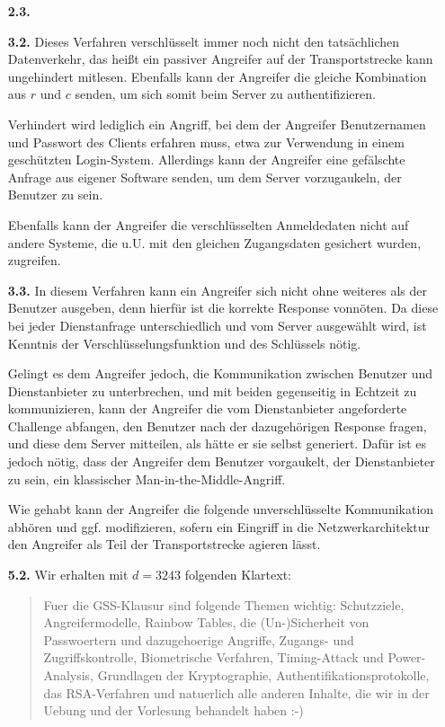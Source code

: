 \documentclass[a4paper,11pt]{article}
\begin{document}
\begin{enumerate}
\item[\textbf{2.3.}]

\item[\textbf{3.2.}]
    Dieses Verfahren verschlüsselt immer noch nicht den tatsächlichen Datenverkehr, das heißt ein passiver Angreifer auf der Transportstrecke kann ungehindert mitlesen. Ebenfalls kann der Angreifer die gleiche Kombination aus $r$ und $c$ senden, um sich somit beim Server zu authentifizieren.

    Verhindert wird lediglich ein Angriff, bei dem der Angreifer Benutzernamen und Passwort des Clients erfahren muss, etwa zur Verwendung in einem geschützten Login-System. Allerdings kann der Angreifer eine gefälschte Anfrage aus eigener Software senden, um dem Server vorzugaukeln, der Benutzer zu sein.

    Ebenfalls kann der Angreifer die verschlüsselten Anmeldedaten nicht auf andere Systeme, die u.U. mit den gleichen Zugangsdaten gesichert wurden, zugreifen.

\item[\textbf{3.3.}]
    In diesem Verfahren kann ein Angreifer sich nicht ohne weiteres als der Benutzer ausgeben, denn hierfür ist die korrekte Response vonnöten. Da diese bei jeder Dienstanfrage unterschiedlich und vom Server ausgewählt wird, ist Kenntnis der Verschlüsselungsfunktion und des Schlüssels nötig.

    Gelingt es dem Angreifer jedoch, die Kommunikation zwischen Benutzer und Dienstanbieter zu unterbrechen, und mit beiden gegenseitig in Echtzeit zu kommunizieren, kann der Angreifer die vom Dienstanbieter angeforderte Challenge abfangen, den Benutzer nach der dazugehörigen Response fragen, und diese dem Server mitteilen, als hätte er sie selbst generiert. Dafür ist es jedoch nötig, dass der Angreifer dem Benutzer vorgaukelt, der Dienstanbieter zu sein, ein klassischer Man-in-the-Middle-Angriff.

    Wie gehabt kann der Angreifer die folgende unverschlüsselte Kommunikation abhören und ggf. modifizieren, sofern ein Eingriff in die Netzwerkarchitektur den Angreifer als Teil der Transportstrecke agieren lässt.

\item[\textbf{5.2.}]
    Wir erhalten mit $d=3243$ folgenden Klartext:
    \begin{quote}
        Fuer die GSS-Klausur sind folgende Themen wichtig: Schutzziele, Angreifermodelle, Rainbow Tables, die (Un-)Sicherheit von Passwoertern und dazugehoerige Angriffe, Zugangs- und Zugriffskontrolle, Biometrische Verfahren, Timing-Attack und Power-Analysis, Grundlagen der Kryptographie, Authentifikationsprotokolle, das RSA-Verfahren und natuerlich alle anderen Inhalte, die wir in der Uebung und der Vorlesung behandelt haben :-)
    \end{quote}


\end{enumerate}
\end{document}
